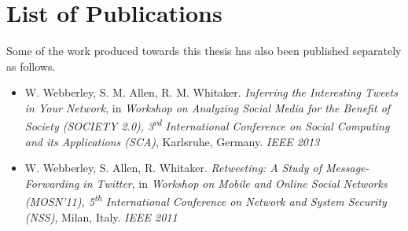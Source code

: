 \newpage
\chapter*{List of Publications}

Some of the work produced towards this thesis has also been published separately as follows.

\begin{itemize} 

\item W. Webberley, S. M. Allen, R. M. Whitaker. \textit{Inferring the Interesting Tweets in Your Network}, 
			in \textit{Workshop on Analyzing Social Media for the Benefit of Society (SOCIETY 2.0), 3\textsuperscript{rd} International Conference on Social Computing and its Applications (SCA)},
			Karlsruhe, Germany. \textit{IEEE 2013}

\item W. Webberley, S. Allen, R. Whitaker. \textit{Retweeting: A Study of Message-Forwarding in Twitter}, 
			in \textit{Workshop on Mobile and Online Social Networks (MOSN'11), 5\textsuperscript{th} International Conference on Network and System Security (NSS)},
			Milan, Italy. \textit{IEEE 2011}

\end{itemize}